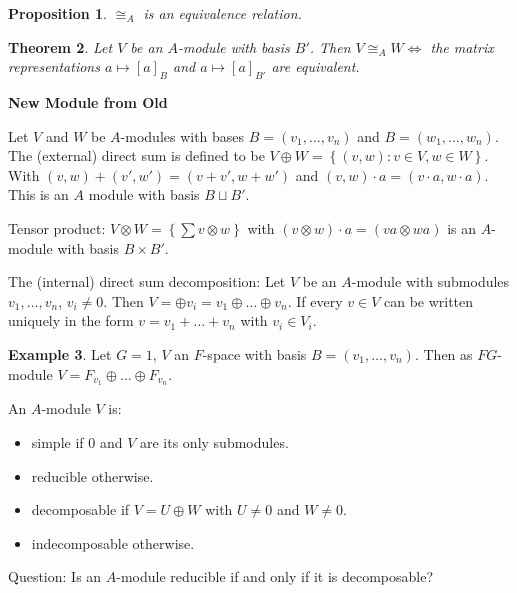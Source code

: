 \documentclass[12pt]{amsart}
\newtheorem{theorem}{Theorem}[section]
\newtheorem{proposition}[theorem]{Proposition}
\theoremstyle{definition}
\newtheorem{example}[theorem]{Example}
\begin{document}
\begin{proposition}
$\cong_{A}$ is an equivalence relation.
\end{proposition}

\begin{theorem}
Let $V$ be an $A$-module with basis $B'$. Then $V \cong_{A} W \Leftrightarrow$ the matrix representations $a \mapsto [a]_{B}$ and $a \mapsto [a]_{B'}$ are equivalent.
\end{theorem}

\begin{center}
\textbf{New Module from Old}
\end{center}

Let $V$ and $W$ be $A$-modules with bases $B = (v_{1}, \ldots, v_{n})$ and $B = ( w_{1}, \ldots, w_{n} )$. The (external) direct sum is defined to be $V \oplus W = \left\{ (v, w) : v \in V, w \in W \right\}$. With $(v, w) + (v', w') = (v + v', w + w')$ and $(v, w) \cdot a = (v \cdot a, w \cdot a )$. This is an $A$ module with basis $B \sqcup B'$.

Tensor product: $V \otimes W = \left\{ \sum v \otimes w \right\}$ with $(v \otimes w ) \cdot a = (v a \otimes w a)$ is an $A$-module with basis $B \times B'$.

The (internal) direct sum decomposition: Let $V$ be an $A$-module with submodules $v_{1}, \ldots, v_{n}$, $v_{i} \neq 0$. Then $V = \oplus v_{i} = v_{1} \oplus \ldots \oplus v_{n}$. If every $v \in V$ can be written uniquely in the form $v = v_{1} + \ldots + v_{n}$ with $v_{i} \in V_{i}$.

\begin{example}
Let $G = 1$, $V$ an $F$-space with basis $B = (v_{1}, \ldots, v_{n})$. Then as $FG$-module $V = F_{v_{1}} \oplus \ldots \oplus F_{v_{n}}$.
\end{example}
An $A$-module $V$ is:
\begin{itemize}
\item simple if 0 and $V$ are its only submodules.
\item reducible otherwise.
\item decomposable if $V = U \oplus W$ with $U \neq 0$ and $W \neq 0$.
\item indecomposable otherwise.
\end{itemize}
Question: Is an $A$-module reducible if and only if it is decomposable?
\end{document}
